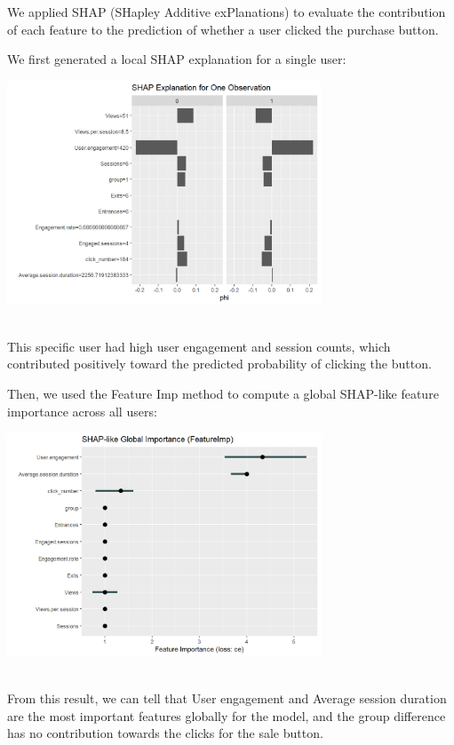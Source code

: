 \documentclass[
  letterpaper,
  DIV=11,
  numbers=noendperiod]{scrartcl}
\begin{document}
We applied SHAP (SHapley Additive exPlanations) to evaluate the
contribution of each feature to the prediction of whether a user clicked
the purchase button.

We first generated a local SHAP explanation for a single user:\\
\begin{center}
\includegraphics[width=0.7\textwidth,height=\textheight]{data_ana_pj3_files/figure-html/unnamed-chunk-10-1.png}
\end{center}
\\
This specific user had high user engagement and session counts, which
contributed positively toward the predicted probability of clicking the
button.

Then, we used the Feature Imp method to compute a global SHAP-like
feature importance across all users:\\
\begin{center}
\includegraphics[width=0.7\textwidth,height=\textheight]{data_ana_pj3_files/figure-html/unnamed-chunk-10-2.png}
\end{center}
\\
From this result, we can tell that User engagement and Average session
duration are the most important features globally for the model, and the
group difference has no contribution towards the clicks for the sale
button.\\
\end{document}
